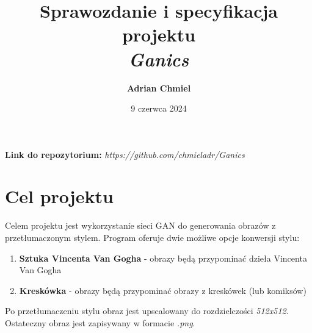 \documentclass{article}
\begin{document}
\title{\textbf{Sprawozdanie i specyfikacja projektu}
\\ \large{\textit{Ganics}}}
\author{\textbf{Adrian Chmiel}}
\date{9 czerwca 2024}
\maketitle

\textbf{Link do repozytorium:} \textit{https://github.com/chmieladr/Ganics}

\section{Cel projektu}
Celem projektu jest wykorzystanie sieci GAN do generowania obrazów z przetłumaczonym stylem. Program oferuje dwie możliwe opcje konwersji stylu:
\begin{enumerate}[label=\arabic*.]
    \setlength\itemsep{0pt}
    \item \textbf{Sztuka Vincenta Van Gogha} - obrazy będą przypominać dzieła Vincenta Van Gogha
    \item \textbf{Kreskówka} - obrazy będą przypominać obrazy z kreskówek (lub komiksów)
\end{enumerate}
Po przetłumaczeniu stylu obraz jest upscalowany do rozdzielczości \textit{512x512}. Ostateczny obraz jest zapisywany w formacie \textit{.png}.
\end{document}
